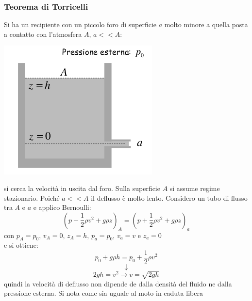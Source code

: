 \documentclass[a4paper,12pt, oneside]{book}
\begin{document}
\subsubsection{Teorema di Torricelli}
Si ha un recipiente con un piccolo foro di superficie $a$ molto minore a quella posta a contatto con l'atmosfera $A$, $a<<A$:
\begin{center}
\includegraphics[scale=0.5]{img/flu7.png}
\end{center}
si cerca la velocità in uscita dal foro. Sulla superficie $A$ si assume regime stazionario. Poiché $a<<A$ il deflusso è molto lento. Considero un tubo di flusso tra $A$ e $a$ e applico Bernoulli:
$$\left(p+\frac{1}{2}\rho v^2+g\rho z\right)_A=\left(p+\frac{1}{2}\rho v^2+g\rho z\right)_a$$
con $p_A=p_0$, $v_A=0$, $z_A=h$, $p_a=p_0$, $v_a=v$ e $z_a=0$\\
e si ottiene:
$$p_0+g\rho h=p_0+\frac{1}{2}\rho v^2$$
$$\downarrow$$
$$2gh=v^2\to v=\sqrt{2gh}$$
quindi la velocità di deflusso non dipende de dalla densità del fluido ne dalla pressione esterna. Si nota come sia uguale al moto in caduta libera
\newpage
\end{document}
